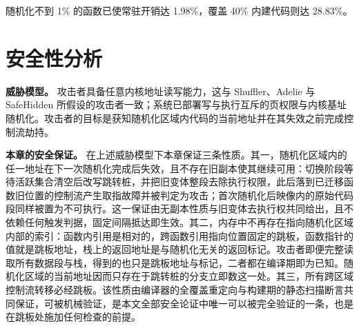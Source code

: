 \begin{table}[!htbp]
    \label{tab:3-12}
    \centering
    \scriptsize
    \setlength{\tabcolsep}{3pt}
    \renewcommand{\arraystretch}{1.25}
\end{table}

随机化不到 1\% 的函数已使常驻开销达 1.98\%，覆盖 40\% 内建代码则达 28.83\%。

\section{安全性分析}

\textbf{威胁模型。} 攻击者具备任意内核地址读写能力，这与 Shuffler、Adelie 与 SafeHidden\citep{wang2019safehidden} 所假设的攻击者一致；系统已部署写与执行互斥的页权限与内核基址随机化。攻击者的目标是获知随机化区域内代码的当前地址并在其失效之前完成控制流劫持。

\textbf{本章的安全保证。} 在上述威胁模型下本章保证三条性质。其一，随机化区域内的任一地址在下一次随机化完成后失效，且不存在旧副本使其继续可用：切换阶段等待活跃集合清空后改写跳转桩，并把旧变体整段去除执行权限，此后落到已迁移函数旧位置的控制流产生取指故障并被判定为攻击；首次随机化后映像内的原始代码段同样被置为不可执行。这一保证由无副本性质与旧变体去执行权共同给出，且不依赖任何触发判据，固定间隔抵达即生效。其二，内存中不再存在指向随机化区域内部的索引：函数内引用是相对的，跨函数引用指向位置固定的跳板，函数指针的值就是跳板地址，栈上的返回地址是与随机化无关的返回标记。攻击者即便完整读取所有数据段与栈，得到的也只是跳板地址与标记，二者都在编译期即为已知。随机化区域的当前地址因而只存在于跳转桩的分支立即数这一处。其三，所有跨区域控制流转移必经跳板。该性质由编译器的全覆盖重定向与构建期的静态扫描断言共同保证，可被机械验证，是本文全部安全论证中唯一可以被完全验证的一条，也是在跳板处施加任何检查的前提。

